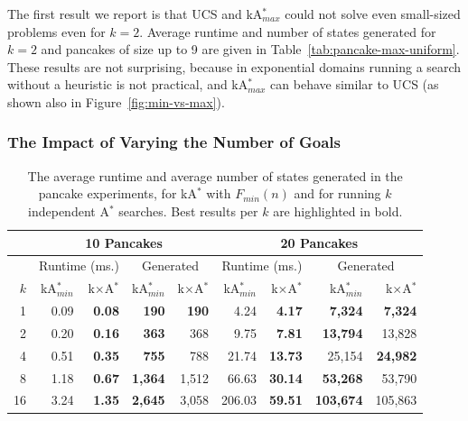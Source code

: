 \documentclass{aicom2e}
\newcommand{\astar}{A$^*$}
\newcommand{\kastar}{kA$^*$}
\newcommand{\kastarmin}{kA$^*_{min}$}
\newcommand{\kastarmax}{kA$^*_{max}$}
\newcommand{\kxastar}{k$\times$A$^*$}
\newcommand{\minf}{$F_{min}(n)$}
\begin{document}
The first result we report is that UCS and \kastarmax{}
could not solve even small-sized problems even for $k=2$. Average runtime and number of states generated  for $k=2$ and pancakes of size up to 9 are given in Table~\ref{tab:pancake-max-uniform}. These results are not surprising, because in exponential domains running a search without a heuristic is not practical, and \kastarmax{} can behave similar to UCS (as shown also in Figure~\ref{fig:min-vs-max}).


\subsubsection{The Impact of Varying the Number of Goals}


\begin{table}[]


            \centering
        \begin{tabular}{|r|r|r|r|r|r|r|r|r|}
            \hline
            & \multicolumn{4}{c|}{{\bf 10 Pancakes}} & \multicolumn{4}{c|}{{\bf 20 Pancakes}}    \\
            \hline
            & \multicolumn{2}{c|}{Runtime (ms.)}   & \multicolumn{2}{c|}{Generated}    & \multicolumn{2}{c|}{Runtime (ms.)}   & \multicolumn{2}{c|}{Generated}    \\
            \hline
            $k$ & \kastarmin{} & \kxastar{} & \kastarmin{} & \kxastar{} & \kastarmin{} & \kxastar{} & \kastarmin{} & \kxastar{}  \\ \hline

1           & 0.09                  & \textbf{0.08}       & \textbf{190}          & \textbf{190}        & 4.24                  & \textbf{4.17}       & \textbf{7,324}        & \textbf{7,324}      \\
2           & 0.20                  & \textbf{0.16}       & \textbf{363}          & 368                 & 9.75                  & \textbf{7.81}       & \textbf{13,794}       & 13,828              \\
4           & 0.51                  & \textbf{0.35}       & \textbf{755}          & 788                 & 21.74                 & \textbf{13.73}      & 25,154                & \textbf{24,982}     \\
8           & 1.18                  & \textbf{0.67}       & \textbf{1,364}        & 1,512               & 66.63                 & \textbf{30.14}      & \textbf{53,268}       & 53,790              \\
16          & 3.24                  & \textbf{1.35}       & \textbf{2,645}        & 3,058               & 206.03                & \textbf{59.51}      & \textbf{103,674}       & 105,863     \\ \hline
    \end{tabular}
    \caption{The average runtime and average number of states generated in the pancake experiments, for \kastar{} with \minf{} and for running $k$ independent \astar{} searches. Best results per $k$ are highlighted in bold.}
    \label{tab:pancake-minf-k-searches}
  \end{table}
\end{document}
